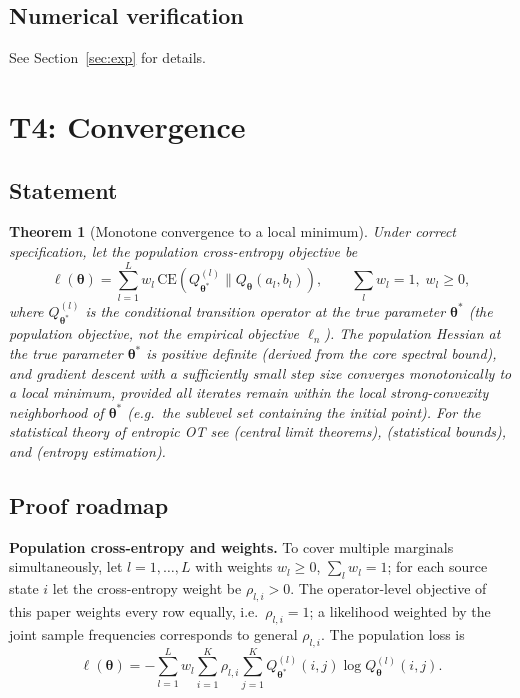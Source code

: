 \documentclass[11pt,a4paper]{article}
\newtheorem{theorem}{Theorem}[section]
\theoremstyle{remark}
\begin{document}
\subsection{Numerical verification}

See Section~\ref{sec:exp} for details.

\section{T4: Convergence}\label{sec:t4}

\subsection{Statement}

\begin{theorem}[Monotone convergence to a local minimum]\label{thm:T4}
Under correct specification, let the population cross-entropy objective be
\[
\ell(\bm{\theta})=\sum_{l=1}^{L}w_l\,\mathrm{CE}(Q_{\bm{\theta}^*}^{(l)}\|Q_{\bm{\theta}}(a_l,b_l)),\qquad \sum_l w_l=1,\; w_l\ge0,
\]
where $Q_{\bm{\theta}^*}^{(l)}$ is the conditional transition operator at the true
parameter $\bm{\theta}^*$ (the population objective, not the empirical objective
$\ell_n$). The population Hessian at the true parameter $\bm{\theta}^*$ is positive
definite (derived from the core spectral bound), and gradient descent with a sufficiently
small step size converges monotonically to a local minimum, provided all iterates remain
within the local strong-convexity neighborhood of $\bm{\theta}^*$ (e.g.\ the sublevel set
containing the initial point). For the statistical theory of entropic OT see
\cite{bigot2019central} (central limit theorems), \cite{mena2019statistical} (statistical
bounds), and \cite{pooladian2021entropic} (entropy estimation).
\end{theorem}

\subsection{Proof roadmap}

\textbf{Population cross-entropy and weights.} To cover multiple marginals
simultaneously, let $l=1,\dots,L$ with weights $w_l\ge0$, $\sum_lw_l=1$; for each source
state $i$ let the cross-entropy weight be $\rho_{l,i}>0$. The operator-level objective of
this paper weights every row equally, i.e.\ $\rho_{l,i}=1$; a likelihood weighted by the
joint sample frequencies corresponds to general $\rho_{l,i}$. The population loss is
\[
\ell(\bm{\theta})=-\sum_{l=1}^{L}w_l\sum_{i=1}^{K}\rho_{l,i}\sum_{j=1}^{K}Q_{\bm{\theta}^*}^{(l)}(i,j)\log Q_{\bm{\theta}}^{(l)}(i,j).
\]
\end{document}
